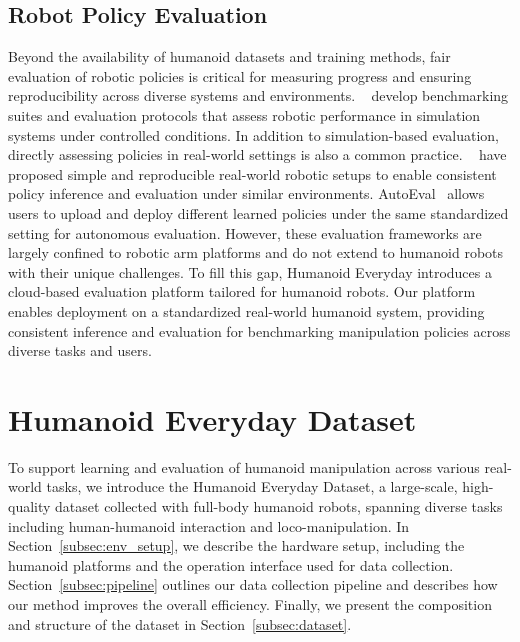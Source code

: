 \documentclass[letterpaper, 10pt, conference]{ieeeconf}
\begin{document}
\subsection{Robot Policy Evaluation}
Beyond the availability of humanoid datasets and training methods, fair evaluation of robotic policies is critical for measuring progress and ensuring reproducibility across diverse systems and environments. 
~\cite{james2020rlbench, lee2021ikea, mees2022calvin, yu2020meta, wang2025roboeval} develop benchmarking suites and evaluation protocols that assess robotic performance in simulation systems under controlled conditions. In addition to simulation-based evaluation, directly assessing policies in real-world settings is also a common practice. ~\cite{yang2019replab, heo2023furniturebench, luo2025fmb} have proposed simple and reproducible real-world robotic setups to enable consistent policy inference and evaluation under similar environments. AutoEval~\cite{zhou2025autoeval} allows users to upload and deploy different learned policies under the same standardized setting for autonomous evaluation. However, these evaluation frameworks are largely confined to robotic arm platforms and do not extend to humanoid robots with their unique challenges. To fill this gap, Humanoid Everyday introduces a cloud-based evaluation platform tailored for humanoid robots. Our platform enables deployment on a standardized real-world humanoid system, providing consistent inference and evaluation for benchmarking manipulation policies across diverse tasks and users.


\section{Humanoid Everyday Dataset}
To support learning and evaluation of humanoid manipulation across various real-world tasks, we introduce the Humanoid Everyday Dataset, a large-scale, high-quality dataset collected with full-body humanoid robots, spanning diverse tasks including human-humanoid interaction and loco-manipulation. In Section~\ref{subsec:env_setup}, we describe the hardware setup, including the humanoid platforms and the operation interface used for data collection. Section~\ref{subsec:pipeline} outlines our data collection pipeline and describes how our method improves the overall efficiency. Finally, we present the composition and structure of the dataset in Section~\ref{subsec:dataset}.
\end{document}

